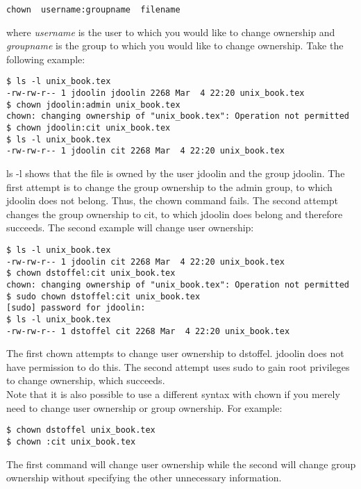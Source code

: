 \begin{verbatim}
chown  username:groupname  filename
\end{verbatim}

where \textit{username} is the user to which you would like to change ownership and \textit{groupname} is the group to which you would like to change ownership.  Take the following example:

\begin{verbatim}
$ ls -l unix_book.tex
-rw-rw-r-- 1 jdoolin jdoolin 2268 Mar  4 22:20 unix_book.tex
$ chown jdoolin:admin unix_book.tex
chown: changing ownership of "unix_book.tex": Operation not permitted
$ chown jdoolin:cit unix_book.tex
$ ls -l unix_book.tex
-rw-rw-r-- 1 jdoolin cit 2268 Mar  4 22:20 unix_book.tex
\end{verbatim}

ls -l shows that the file is owned by the user jdoolin and the group jdoolin.  The first attempt is to change the group ownership to the admin group, to which jdoolin does not belong.  Thus, the chown command fails.  The second attempt changes the group ownership to cit, to which jdoolin does belong and therefore succeeds.  The second example will change user ownership:

\begin{verbatim}
$ ls -l unix_book.tex
-rw-rw-r-- 1 jdoolin cit 2268 Mar  4 22:20 unix_book.tex
$ chown dstoffel:cit unix_book.tex
chown: changing ownership of "unix_book.tex": Operation not permitted
$ sudo chown dstoffel:cit unix_book.tex
[sudo] password for jdoolin:
$ ls -l unix_book.tex
-rw-rw-r-- 1 dstoffel cit 2268 Mar  4 22:20 unix_book.tex
\end{verbatim}

The first chown attempts to change user ownership to dstoffel.  jdoolin does not have permission to do this.  The second attempt uses sudo to gain root privileges to change ownership, which succeeds.\\

Note that it is also possible to use a different syntax with chown if you merely need to change user ownership or group ownership.  For example:

\begin{verbatim}
$ chown dstoffel unix_book.tex
$ chown :cit unix_book.tex
\end{verbatim}

The first command will change user ownership while the second will change group ownership without specifying the other unnecessary information.

